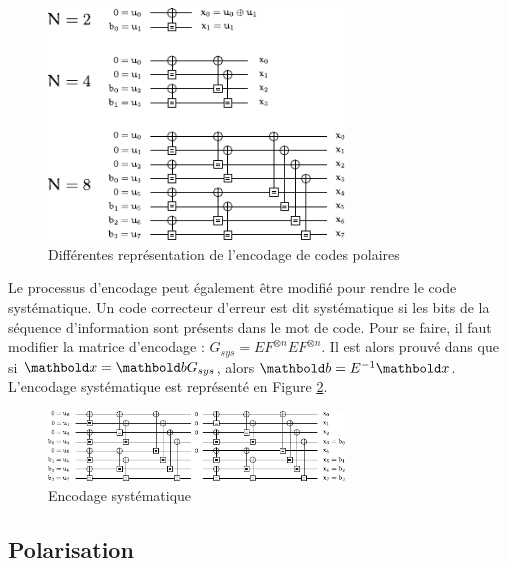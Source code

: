 \begin{figure}[t]
\centering
\includegraphics[width=0.7\textwidth]{main/ch1_fig/Graph_N_rec}
\caption{Différentes représentation de l'encodage de codes polaires}
\label{fig:encodage}
\end{figure}

Le processus d'encodage peut également être modifié pour rendre le code systématique. Un code correcteur d'erreur est dit systématique si les bits de la séquence d'information sont présents dans le mot de code. Pour se faire, il faut modifier la matrice d'encodage : $G_{sys}=EF^{\otimes n}EF^{\otimes n}$. Il est alors prouvé dans \cite{arikan_systematic_2011} que si $\mb{x}=\mb{b}G_{sys}$, alors $\mb{b}=E^{-1}\mb{x}$. L'encodage systématique est représenté en Figure \ref{fig:sys}.

\begin{figure}[t]
\centering
\includegraphics[width=0.7\textwidth]{main/ch1_fig/Graph_N_sys}
\caption{Encodage systématique}
\label{fig:sys}
\end{figure}

\subsection{Polarisation}


